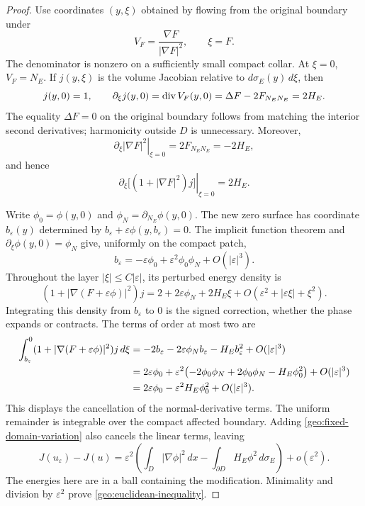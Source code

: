 \begin{proof}
Use coordinates $(y,\xi)$ obtained by flowing from the original
boundary under
\[
 V_F=\frac{\nabla F}{|\nabla F|^2},\qquad \xi=F.
\]
The denominator is nonzero on a sufficiently small compact collar.
At $\xi=0$, $V_F=N_E$. If $j(y,\xi)$ is the volume Jacobian relative
to $d\sigma_E(y)\,d\xi$, then
\begin{equation}\label{geo:flow-jacobian}
 j(y,0)=1,\qquad
 \partial_\xi j(y,0)=\operatorname{div} V_F(y,0)
 =\Delta F-2F_{N_EN_E}=2H_E.
\end{equation}
The equality $\Delta F=0$ on the original boundary follows from
matching the interior second derivatives; harmonicity outside $D$
is unnecessary. Moreover,
\[
 \left.\partial_\xi|\nabla F|^2\right|_{\xi=0}
 =2F_{N_EN_E}=-2H_E,
\]
and hence
\begin{equation}\label{geo:edge-density-derivative}
 \left.\partial_\xi\bigl[(1+|\nabla F|^2)j\bigr]
 \right|_{\xi=0}=2H_E.
\end{equation}

Write $\phi_0=\phi(y,0)$ and
$\phi_N=\partial_{N_E}\phi(y,0)$.
The new zero surface has coordinate $b_\varepsilon(y)$ determined by
$b_\varepsilon+\varepsilon\phi(y,b_\varepsilon)=0$.
The implicit function theorem and
$\partial_\xi\phi(y,0)=\phi_N$ give, uniformly on the compact patch,
\begin{equation}\label{geo:moving-edge}
 b_\varepsilon=-\varepsilon\phi_0
      +\varepsilon^2\phi_0\phi_N+O(|\varepsilon|^3).
\end{equation}
Throughout the layer $|\xi|\le C|\varepsilon|$, its perturbed energy
density is
\begin{equation}\label{geo:layer-density}
 (1+|\nabla(F+\varepsilon\phi)|^2)j
 =2+2\varepsilon\phi_N+2H_E\xi
      +O(\varepsilon^2+|\varepsilon\xi|+\xi^2).
\end{equation}
Integrating this density from $b_\varepsilon$ to $0$ is the signed
correction, whether the phase expands or contracts. The terms of
order at most two are
\begin{align}
 \int_{b_\varepsilon}^{0}
       (1+|\nabla(F+\varepsilon\phi)|^2)j\,d\xi
 &=-2b_\varepsilon-2\varepsilon\phi_N b_\varepsilon
      -H_E b_\varepsilon^2+O(|\varepsilon|^3)\notag\\
 &=2\varepsilon\phi_0
   +\varepsilon^2\bigl(-2\phi_0\phi_N
          +2\phi_0\phi_N-H_E\phi_0^2\bigr)
       +O(|\varepsilon|^3)\notag\\
 &=2\varepsilon\phi_0-\varepsilon^2H_E\phi_0^2
       +O(|\varepsilon|^3).
 \label{geo:layer-cancellation}
\end{align}
This displays the cancellation of the normal-derivative terms.
The uniform remainder is integrable over the compact affected
boundary. Adding \eqref{geo:fixed-domain-variation} also cancels the
linear terms, leaving
\[
 J(u_\varepsilon)-J(u)
 =\varepsilon^2\left(
      \int_D|\nabla\phi|^2\,dx
        -\int_{\partial D}H_E\phi^2\,d\sigma_E\right)
       +o(\varepsilon^2).
\]
The energies here are in a ball containing the modification.
Minimality and division by $\varepsilon^2$ prove
\eqref{geo:euclidean-inequality}.
\end{proof}

